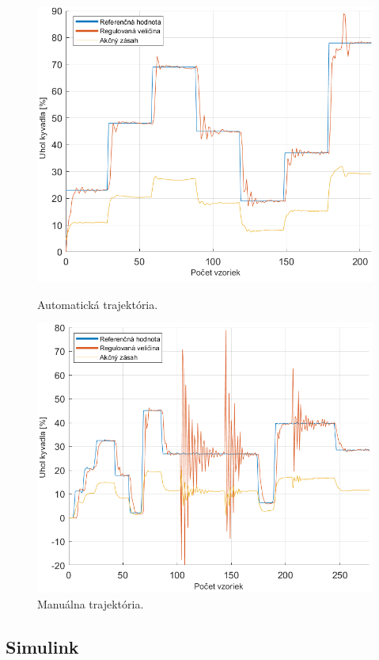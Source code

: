 \begin{figure}[!tbh]
	\centering
	\includegraphics[width=125mm]{obr/PIDautomaMat.png}
	\caption{Automatická trajektória.}\label{OBRAZOK 2.6.2}
	
	\centering
	\includegraphics[width=125mm]{obr/pidmanualbuch.png}
	\caption{Manuálna trajektória.}\label{OBRAZOK 2.6.3}
\end{figure}


\subsection{Simulink}

